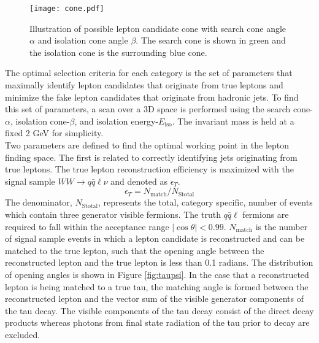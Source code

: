\begin{figure}[hp]
\centering
\captionsetup{justification=raggedright,margin=3cm}
\texttt{[image: cone.pdf]}
\caption{Illustration of possible lepton candidate cone with search cone angle $\alpha$ and isolation cone angle $\beta$. The search cone is shown in green and the isolation cone is the surrounding blue cone.}
\end{figure}


 The optimal selection criteria for each category is the set of parameters that maximally identify lepton candidates that originate from true leptons and minimize the fake lepton candidates that originate from hadronic jets. To find this set of parameters, a scan over a 3D space is performed using the search cone-$\alpha$, isolation cone-$\beta$, and isolation energy-$E_{\text{iso}}$. The invariant mass is held at a fixed 2 GeV for simplicity.\\
Two parameters are defined to find the optimal working point in the lepton finding space. The first is related to correctly identifying jets originating from true leptons.
The true lepton reconstruction efficiency is maximized with the signal sample $WW\rightarrow q\bar{q}\ell\nu$ and denoted as  $\epsilon_T$.
\begin{equation}
\label{eq:et}
\epsilon_T = N_{\text{match}}/N_{\text{Stotal}}
\end{equation}
 The denominator, $N_{\text{Stotal}}$, represents the total, category specific, number of events which contain three generator visible fermions. The truth $q\bar{q}\ell$ fermions are required to fall within the acceptance range $|\cos\theta| < 0.99$. $N_{\text{match}}$ is the number of signal sample events in which a lepton candidate is reconstructed and can be matched to the true lepton, such that the opening angle between the reconstructed lepton and the true lepton is less than 0.1 radians. The distribution of opening angles is shown in Figure \ref{fig:taupsi}. In the case that a reconstructed lepton is being matched to a true tau, the matching angle is formed between the reconstructed lepton and the vector sum of the visible generator components of the tau decay. The visible components of the tau decay consist of the direct decay products whereas photons from final state radiation of the tau prior to decay are excluded.



